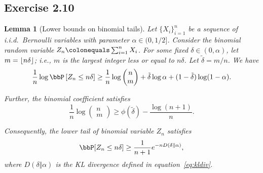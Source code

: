 \documentclass[11pt]{article}
\DeclarePairedDelimiter\floor{\lfloor}{\rfloor}
\newcommand{\off}[1]{\left[#1\right]}
\theoremstyle{plain}
\newtheorem{lem}{Lemma}
\theoremstyle{definition}
\begin{document}
\subsection{Exercise 2.10}
\begin{lem}[Lower bounds on binomial tails]
	Let $\{X_i\}_{i=1}^n$ be a sequence of i.i.d.\ Bernoulli variables with parameter $\alpha \in (0,1/2]$. Consider the binomial random variable $Z_n \colonequals \sum_{i=1}^n X_i$. For some fixed $\delta \in (0,\alpha)$, let $m = \floor{n\delta}$; i.e., $m$ is the largest integer less or equal to $n \delta$. Let $ \tilde \delta = {m}/{n}$. We have
	\begin{equation}\label{eq:e2101}
		\frac{1}{n} \log \bbP \off{Z_n \leq n\delta} \geq \frac{1}{n} \log \begin{pmatrix}
			n \\ m	\end{pmatrix} + \tilde \delta \log \alpha + (1 - \tilde \delta ) \log (1-\alpha).
	\end{equation}
	
	Further, the binomial coefficient satisfies
	\begin{equation}\label{eq:e2102}
		\frac{1}{n} \log \begin{pmatrix}
			n \\ m	\end{pmatrix} \geq \phi(\tilde \delta ) - \frac{\log (n+1)}{n}.
	\end{equation}
	
	Consequently, the lower tail of binomial variable $Z_n$ satisfies
	\begin{equation}\label{eq:e2103}
		\bbP[Z_n \leq n \delta]  \geq \frac{1}{n+1} e^{-nD(\delta \Vert \alpha)},
	\end{equation}
	where $D(\delta \Vert \alpha)$ is the KL divergence defined in equation~\eqref{eq:kldiv}.
\end{lem}
\end{document}
